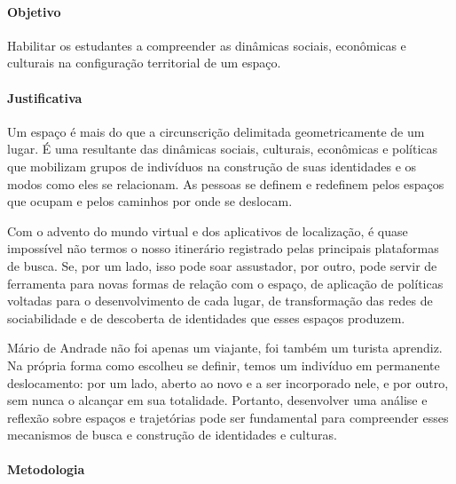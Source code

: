 \documentclass[12pt]{extarticle}
\begin{document}
\paragraph{Objetivo} Habilitar os estudantes a compreender as dinâmicas
sociais, econômicas e culturais na configuração territorial de um
espaço.

\paragraph{Justificativa} Um espaço é mais do que a circunscrição
delimitada geometricamente de um lugar. É uma resultante das dinâmicas
sociais, culturais, econômicas e políticas que mobilizam grupos de
indivíduos na construção de suas identidades e os modos como eles se
relacionam. As pessoas se definem e redefinem pelos espaços que ocupam e
pelos caminhos por onde se deslocam.

Com o advento do mundo virtual e dos aplicativos de localização, é quase
impossível não termos o nosso itinerário registrado pelas principais
plataformas de busca. Se, por um lado, isso pode soar assustador, por
outro, pode servir de ferramenta para novas formas de relação com o
espaço, de aplicação de políticas voltadas para o desenvolvimento de cada
lugar, de transformação das redes de sociabilidade e de descoberta de
identidades que esses espaços produzem.

Mário de Andrade não foi apenas um viajante, foi também um turista aprendiz. Na
própria forma como escolheu se definir, temos um indivíduo em permanente
deslocamento: por um lado, aberto ao novo e a ser incorporado nele, e
por outro, sem nunca o alcançar em sua totalidade. Portanto, desenvolver
uma análise e reflexão sobre espaços e trajetórias pode ser fundamental
para compreender esses mecanismos de busca e construção de identidades
e culturas.

\paragraph{Metodologia} 
\end{document}
